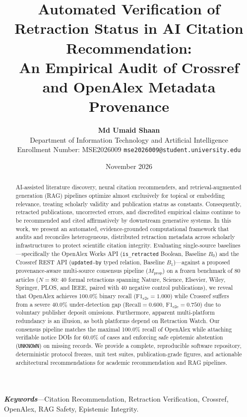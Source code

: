 \documentclass[10pt,a4paper,twocolumn]{article}
\title{\textbf{\Large Automated Verification of Retraction Status in AI Citation Recommendation:}\\[0.3ex] \large An Empirical Audit of Crossref and OpenAlex Metadata Provenance}
\author{
    \textbf{Md Umaid Shaan} \\
    Department of Information Technology and Artificial Intelligence \\
    Enrollment Number: MSE2026009 \quad \texttt{mse2026009@student.university.edu}
}
\date{November 2026}
\begin{document}
\maketitle

\begin{abstract}
AI-assisted literature discovery, neural citation recommenders, and retrieval-augmented generation (RAG) pipelines optimize almost exclusively for topical or embedding relevance, treating scholarly validity and publication status as constants. Consequently, retracted publications, uncorrected errors, and discredited empirical claims continue to be recommended and cited affirmatively by downstream generative systems. In this work, we present an automated, evidence-grounded computational framework that audits and reconciles heterogeneous, distributed retraction metadata across scholarly infrastructures to protect scientific citation integrity. Evaluating single-source baselines—specifically the OpenAlex Works API (\texttt{is\_retracted} Boolean, Baseline $B_0$) and the Crossref REST API (\texttt{updated-by} typed relation, Baseline $B_1$)—against a proposed provenance-aware multi-source consensus pipeline ($M_{\text{prop}}$) on a frozen benchmark of 80 articles ($N=80$: 40 formal retractions spanning Nature, Science, Elsevier, Wiley, Springer, PLOS, and IEEE, paired with 40 negative control publications), we reveal that OpenAlex achieves 100.0\% binary recall ($\text{F1}_{\text{e2e}}=1.000$) while Crossref suffers from a severe 40.0\% under-detection gap ($\text{Recall}=0.600$, $\text{F1}_{\text{e2e}}=0.750$) due to voluntary publisher deposit omissions. Furthermore, apparent multi-platform redundancy is an illusion, as both platforms depend on Retraction Watch. Our consensus pipeline matches the maximal 100.0\% recall of OpenAlex while attaching verifiable notice DOIs for 60.0\% of cases and enforcing safe epistemic abstention (\texttt{UNKNOWN}) on missing records. We provide a complete, reproducible software repository, deterministic protocol freezes, unit test suites, publication-grade figures, and actionable architectural recommendations for academic recommendation and RAG pipelines.
\end{abstract}

\textbf{\textit{Keywords}}---Citation Recommendation, Retraction Verification, Crossref, OpenAlex, RAG Safety, Epistemic Integrity.
\end{document}
